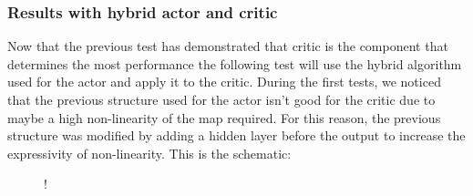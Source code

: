 \subsubsection{Results with hybrid actor and critic}
Now that the previous test has demonstrated that critic is the component that determines the most performance the following test will use the hybrid algorithm used for the actor and apply it to the critic. During the first tests, we noticed that the previous structure used for the actor isn't good for the critic due to maybe a high non-linearity of the map required. For this reason, the previous structure was modified by adding a hidden layer before the output to increase the expressivity of non-linearity. This is the schematic:\\
\begin{figure}[!h]
	\centering
	 {!} {
		}
\end{figure}
